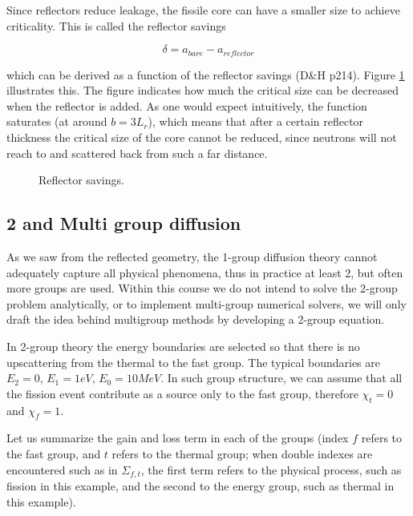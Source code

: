 Since reflectors reduce leakage, the fissile core can have a smaller size to achieve criticality. This is called the reflector savings

\begin{equation}
\delta = a_{bare}-a_{reflector}
\end{equation}

\noindent which can be derived as a function of the reflector savings (D\&H p214). Figure \ref{fig:reflectorsavings} illustrates this. The figure indicates how much the critical size can be decreased when the reflector is added. As one would expect intuitively, the function saturates (at around $b=3L_r$), which means that after a certain reflector thickness the critical size of the core cannot be reduced, since neutrons will not reach to and scattered back from such a far distance.

\begin{figure}[ht!]
\protect {}\protect
\caption{\label{fig:reflectorsavings} \footnotesize{Reflector savings.}}
\end{figure} 

\subsection{2 and Multi group diffusion}

As we saw from the reflected geometry, the 1-group diffusion theory cannot adequately capture all physical phenomena, thus in practice at least 2, but often more groups are used. Within this course we do not intend to solve the 2-group problem analytically, or to implement multi-group numerical solvers, we will only draft the idea behind multigroup methods by developing a 2-group equation.

In 2-group theory the energy boundaries are selected so that there is no upscattering from the thermal to the fast group. The typical boundaries are $E_2=0$, $E_1=1 eV$, $E_0=10 MeV$. In such group structure, we can assume that all the fission event contribute as a source only to the fast group, therefore $\chi_t=0$ and $\chi_f=1$.

Let us summarize the gain and loss term in each of the groups (index $f$ refers to the fast group, and $t$ refers to the thermal group; when double indexes are encountered such as in $\Sigma_{f,t}$, the first term refers to the physical process, such as fission in this example, and the second to the energy group, such as thermal in this example).


